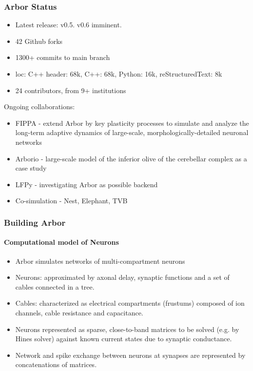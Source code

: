 \documentclass[t]{beamer}
\begin{document}
% 

\begin{frame}
    \frametitle{Arbor Status}

    \begin{itemize}
        \item Latest release: v0.5. v0.6 imminent.
        \item 42 Github forks
        \item 1300+ commits to main branch
        \item loc: C++ header: 68k, C++: 68k, Python: 16k, reStructuredText: 8k
        \item 24 contributors, from 9+ institutions
    \end{itemize}

    Ongoing collaborations:
    \begin{itemize}
    \item FIPPA - extend Arbor by key plasticity processes to simulate and analyze the long-term adaptive dynamics of large-scale, morphologically-detailed neuronal networks
    \item Arborio - large-scale model of the inferior olive of the cerebellar complex as a case study
    \item LFPy - investigating Arbor as possible backend
    \item Co-simulation - Nest, Elephant, TVB
    \end{itemize}

\end{frame}

\begin{frame}
    \frametitle{Building Arbor}
    \framesubtitle{Computational model of Neurons}
    \begin{itemize}
    \item Arbor simulates networks of multi-compartment neurons
    \item Neurons: approximated by axonal delay, synaptic functions and a set of cables connected in a tree.
    \item Cables: characterized as electrical compartments (frustums) composed of ion channels, cable resistance and capacitance.
    \item Neurons represented as sparse, close-to-band matrices to be solved (e.g. by Hines solver) against known current states due to synaptic conductance.
    \item Network and spike exchange between neurons at synapses are represented by concatenations of matrices.
    \end{itemize}
\end{frame}
\end{document}
